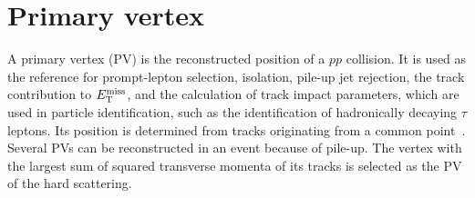 \section{Primary vertex}
\label{sec:ch6_primary_vertex}

A primary vertex (PV) is the reconstructed position of a $pp$ collision.
It is used as the reference for prompt-lepton selection, isolation, pile-up jet rejection, the track contribution to $E_{\mathrm{T}}^{\mathrm{miss}}$, and the calculation of track impact parameters, which are used in particle identification, such as the identification of hadronically decaying $\tau$ leptons.
Its position is determined from tracks originating from a common point~\cite{ATLAS2026TrackVertex}.
Several PVs can be reconstructed in an event because of pile-up.
The vertex with the largest sum of squared transverse momenta of its tracks is selected as the PV of the hard scattering.
